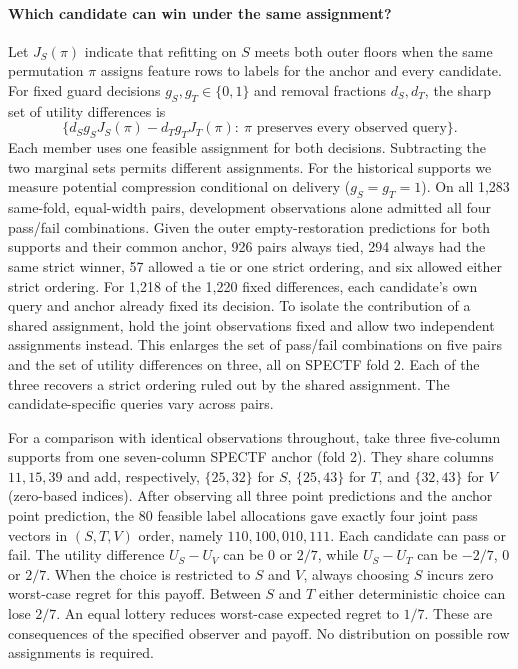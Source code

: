 \paragraph{Which candidate can win under the same assignment?}
Let $J_S(\pi)$ indicate that refitting on $S$ meets both outer floors when the same permutation $\pi$ assigns feature rows to labels for the anchor and every candidate. For fixed guard decisions $g_S,g_T\in\{0,1\}$ and removal fractions $d_S,d_T$, the sharp set of utility differences is
\[
 \bigl\{d_Sg_S J_S(\pi)-d_Tg_T J_T(\pi):\ \pi\text{ preserves every observed query}\bigr\}.
\]
Each member uses one feasible assignment for both decisions. Subtracting the two marginal sets permits different assignments. For the historical supports we measure potential compression conditional on delivery ($g_S=g_T=1$). On all 1,283 same-fold, equal-width pairs, development observations alone admitted all four pass/fail combinations. Given the outer empty-restoration predictions for both supports and their common anchor, 926 pairs always tied, 294 always had the same strict winner, 57 allowed a tie or one strict ordering, and six allowed either strict ordering. For 1,218 of the 1,220 fixed differences, each candidate's own query and anchor already fixed its decision. To isolate the contribution of a shared assignment, hold the joint observations fixed and allow two independent assignments instead. This enlarges the set of pass/fail combinations on five pairs and the set of utility differences on three, all on SPECTF fold 2. Each of the three recovers a strict ordering ruled out by the shared assignment. The candidate-specific queries vary across pairs.

For a comparison with identical observations throughout, take three five-column supports from one seven-column SPECTF anchor (fold 2). They share columns $11,15,39$ and add, respectively, $\{25,32\}$ for $S$, $\{25,43\}$ for $T$, and $\{32,43\}$ for $V$ (zero-based indices). After observing all three point predictions and the anchor point prediction, the 80 feasible label allocations gave exactly four joint pass vectors in $(S,T,V)$ order, namely $110,100,010,111$. Each candidate can pass or fail. The utility difference $U_S-U_V$ can be $0$ or $2/7$, while $U_S-U_T$ can be $-2/7$, $0$ or $2/7$. When the choice is restricted to $S$ and $V$, always choosing $S$ incurs zero worst-case regret for this payoff. Between $S$ and $T$ either deterministic choice can lose $2/7$. An equal lottery reduces worst-case expected regret to $1/7$. These are consequences of the specified observer and payoff. No distribution on possible row assignments is required.
